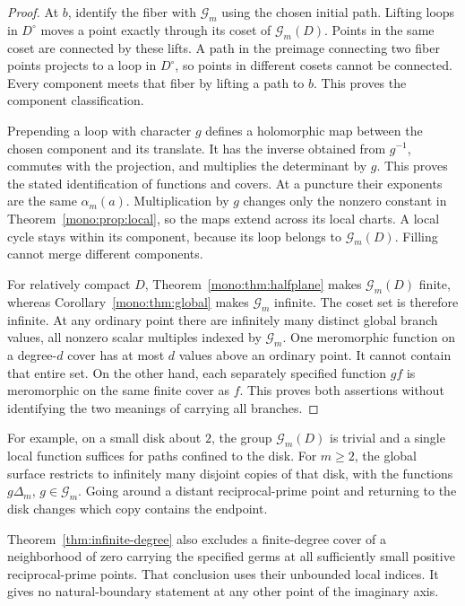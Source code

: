 \begin{proof}
At \(b\), identify the fiber with \(\mathcal G_m\) using the chosen initial path.
Lifting loops in \(D^\circ\) moves a point exactly through its coset
of \(\mathcal G_m(D)\).
Points in the same coset are connected by these lifts.
A path in the preimage connecting two fiber points projects to a loop
in \(D^\circ\), so points in different cosets cannot be connected.
Every component meets that fiber by lifting a path to \(b\).
This proves the component classification.

Prepending a loop with character \(g\) defines a holomorphic map between
the chosen component and its translate.
It has the inverse obtained from \(g^{-1}\), commutes with the projection,
and multiplies the determinant by \(g\).
This proves the stated identification of functions and covers.
At a puncture their exponents are the same \(\alpha_m(a)\).
Multiplication by \(g\) changes only the nonzero constant in
Theorem~\ref{mono:prop:local}, so the maps extend across its local charts.
A local cycle stays within its component, because its loop belongs to
\(\mathcal G_m(D)\).  Filling cannot merge different components.

For relatively compact \(D\), Theorem~\ref{mono:thm:halfplane} makes
\(\mathcal G_m(D)\) finite, whereas Corollary~\ref{mono:thm:global} makes \(\mathcal G_m\) infinite.
The coset set is therefore infinite.
At any ordinary point there are infinitely many distinct global branch
values, all nonzero scalar multiples indexed by \(\mathcal G_m\).
One meromorphic function on a degree-\(d\) cover has at most \(d\)
values above an ordinary point.  It cannot contain that entire set.
On the other hand, each separately specified function \(g f\) is
meromorphic on the same finite cover as \(f\).
This proves both assertions without identifying the two meanings of
carrying all branches.
\end{proof}

For example, on a small disk about \(2\), the group \(\mathcal G_m(D)\) is
trivial and a single local function suffices for paths confined to the disk.
For \(m\geq2\), the global surface restricts to infinitely many disjoint
copies of that disk, with the functions \(g\Delta_m\), \(g\in \mathcal G_m\).
Going around a distant reciprocal-prime point and returning to the disk
changes which copy contains the endpoint.

Theorem~\ref{thm:infinite-degree} also excludes a finite-degree cover
of a neighborhood of zero carrying the specified germs at all sufficiently
small positive reciprocal-prime points.  That conclusion uses their
unbounded local indices.  It gives no natural-boundary statement at any
other point of the imaginary axis.

